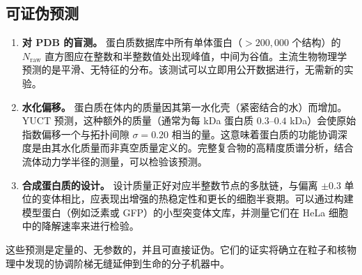 \documentclass[12pt,a4paper,fontset=fandol]{ctexart}
\begin{document}
	\subsection{可证伪预测}
	\begin{enumerate}
		\item \textbf{对 PDB 的盲测。} 蛋白质数据库中所有单体蛋白（\(>200,000\) 个结构）的 \(N_{\mathrm{raw}}\) 直方图应在整数和半整数值处出现峰值，中间为谷值。主流生物物理学预测的是平滑、无特征的分布。该测试可以立即用公开数据进行，无需新的实验。
		\item \textbf{水化偏移。} 蛋白质在体内的质量因其第一水化壳（紧密结合的水）而增加。YUCT 预测，这种额外的质量（通常为每 kDa 蛋白质 \(0.3\)--\(0.4\) kDa）会使原始指数偏移一个与拓扑间隙 \(\sigma = 0.20\) 相当的量。这意味着蛋白质的功能协调深度是由其水化质量而非真空质量定义的。完整复合物的高精度质谱分析，结合流体动力学半径的测量，可以检验该预测。
		\item \textbf{合成蛋白质的设计。} 设计质量正好对应半整数节点的多肽链，与偏离 \(\pm 0.3\) 单位的变体相比，应表现出增强的热稳定性和更长的细胞半衰期。可以通过构建模型蛋白（例如泛素或 GFP）的小型突变体文库，并测量它们在 HeLa 细胞中的降解速率来进行检验。
	\end{enumerate}
	
	这些预测是定量的、无参数的，并且可直接证伪。它们的证实将确立在粒子和核物理中发现的协调阶梯无缝延伸到生命的分子机器中。
	
\end{document}

